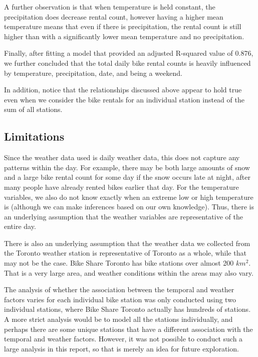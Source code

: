 \documentclass[
]{article}
\begin{document}
A further observation is that when temperature is held constant, the
precipitation does decrease rental count, however having a higher mean
temperature means that even if there is precipitation, the rental count
is still higher than with a significantly lower mean temperature and no
precipitation.

Finally, after fitting a model that provided an adjusted R-squared value
of 0.876, we further concluded that the total daily bike rental counts
is heavily influenced by temperature, precipitation, date, and being a
weekend.

In addition, notice that the relationships discussed above appear to
hold true even when we consider the bike rentals for an individual
station instead of the sum of all stations.

\hypertarget{limitations}{%
\subsection{Limitations}\label{limitations}}

Since the weather data used is daily weather data, this does not capture
any patterns within the day. For example, there may be both large
amounts of snow and a large bike rental count for some day if the snow
occurs late at night, after many people have already rented bikes
earlier that day. For the temperature variables, we also do not know
exactly when an extreme low or high temperature is (although we can make
inferences based on our own knowledge). Thus, there is an underlying
assumption that the weather variables are representative of the entire
day.

There is also an underlying assumption that the weather data we
collected from the Toronto weather station is representative of Toronto
as a whole, while that may not be the case. Bike Share Toronto has bike
stations over almost 200 \(km^2\). That is a very large area, and
weather conditions within the areas may also vary.

The analysis of whether the association between the temporal and weather
factors varies for each individual bike station was only conducted using
two individual stations, where Bike Share Toronto actually has hundreds
of stations. A more strict analysis would be to model all the stations
individually, and perhaps there are some unique stations that have a
different association with the temporal and weather factors. However, it
was not possible to conduct such a large analysis in this report, so
that is merely an idea for future exploration.
\end{document}
